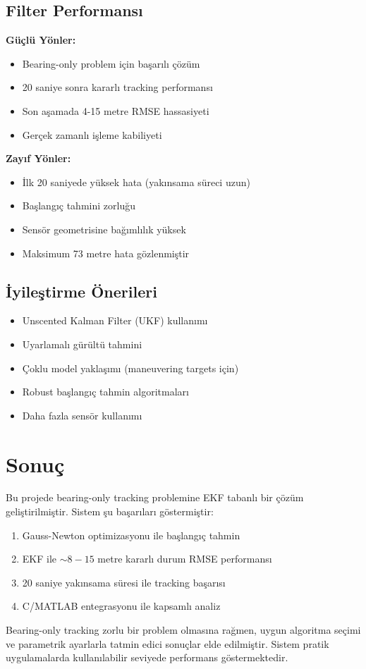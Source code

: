 \documentclass[11pt,a4paper]{article}
\begin{document}
\subsection{Filter Performansı}
\textbf{Güçlü Yönler:}
\begin{itemize}
    \item Bearing-only problem için başarılı çözüm
    \item 20 saniye sonra kararlı tracking performansı
    \item Son aşamada 4-15 metre RMSE hassasiyeti
    \item Gerçek zamanlı işleme kabiliyeti
\end{itemize}

\textbf{Zayıf Yönler:}
\begin{itemize}
    \item İlk 20 saniyede yüksek hata (yakınsama süreci uzun)
    \item Başlangıç tahmini zorluğu
    \item Sensör geometrisine bağımlılık yüksek
    \item Maksimum 73 metre hata gözlenmiştir
\end{itemize}

\subsection{İyileştirme Önerileri}
\begin{itemize}
    \item Unscented Kalman Filter (UKF) kullanımı
    \item Uyarlamalı gürültü tahmini
    \item Çoklu model yaklaşımı (maneuvering targets için)
    \item Robust başlangıç tahmin algoritmaları
    \item Daha fazla sensör kullanımı
\end{itemize}

\section{Sonuç}

Bu projede bearing-only tracking problemine EKF tabanlı bir çözüm geliştirilmiştir. Sistem şu başarıları göstermiştir:

\begin{enumerate}
    \item Gauss-Newton optimizasyonu ile başlangıç tahmin
    \item EKF ile $\sim 8-15$ metre kararlı durum RMSE performansı
    \item 20 saniye yakınsama süresi ile tracking başarısı
    \item C/MATLAB entegrasyonu ile kapsamlı analiz
\end{enumerate}

Bearing-only tracking zorlu bir problem olmasına rağmen, uygun algoritma seçimi ve parametrik ayarlarla tatmin edici sonuçlar elde edilmiştir. Sistem pratik uygulamalarda kullanılabilir seviyede performans göstermektedir.
\end{document}
